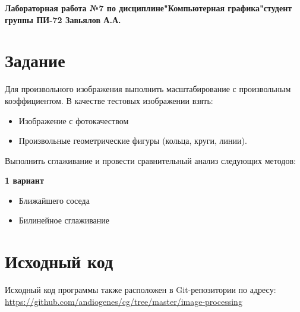 \documentclass[a4paper,12pt]{article}
\begin{document}

\begin{center}
  \textbf{Лабораторная работа №7 по дисциплине\linebreak"Компьютерная графика"\linebreak{} студент группы ПИ-72 Завьялов А.А.}\\
\end{center}

\section{\normalsize{Задание}}
\begin{flushleft}
Для произвольного изображения выполнить масштабирование с произвольным коэффициентом. В качестве тестовых изображении взять:

\begin{itemize}
    \item Изображение с фотокачеством
    \item Произвольные геометрические фигуры (кольца, круги, линии).
\end{itemize}

Выполнить сглаживание и провести сравнительный анализ следующих методов:

\textbf{1 вариант}

\begin{itemize}
    \item Ближайшего соседа
    \item Билинейное сглаживание
\end{itemize}

\end{flushleft}

\section{\normalsize{Исходный код}}
Исходный код программы также расположен в Git-репозитории по адресу: \url{https://github.com/andiogenes/cg/tree/master/image-processing}
\inputminted[breaklines]{py}{../resampling.py}
\end{document}
